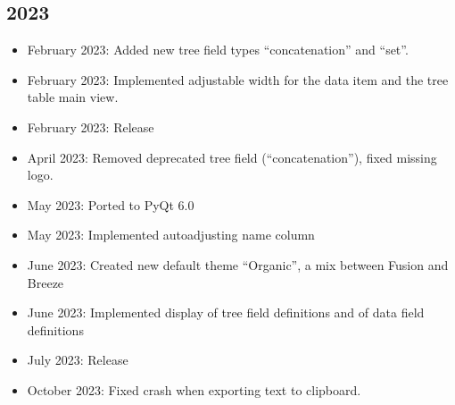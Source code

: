 \documentclass[letterpaper,10pt,english]{sphinxmanual}
\begin{document}
\subsection{2023}
\label{\detokenize{releases:id9}}\begin{itemize}
\item {} 
\sphinxAtStartPar
February 2023: Added new tree field types “concatenation” and “set”.

\item {} 
\sphinxAtStartPar
February 2023: Implemented adjustable width for the data item and the tree table main view.

\item {} 
\sphinxAtStartPar
February 2023: Release 

\item {} 
\sphinxAtStartPar
April 2023: Removed deprecated tree field (“concatenation”), fixed missing logo.

\item {} 
\sphinxAtStartPar
May 2023: Ported to PyQt 6.0

\item {} 
\sphinxAtStartPar
May 2023: Implemented auto\sphinxhyphen{}adjusting name column

\item {} 
\sphinxAtStartPar
June 2023: Created new default theme “Organic”, a mix between Fusion and Breeze

\item {} 
\sphinxAtStartPar
June 2023: Implemented display of tree field definitions and of data field definitions

\item {} 
\sphinxAtStartPar
July 2023: Release 

\item {} 
\sphinxAtStartPar
October 2023: Fixed crash when exporting text to clipboard.

\end{itemize}
\end{document}
